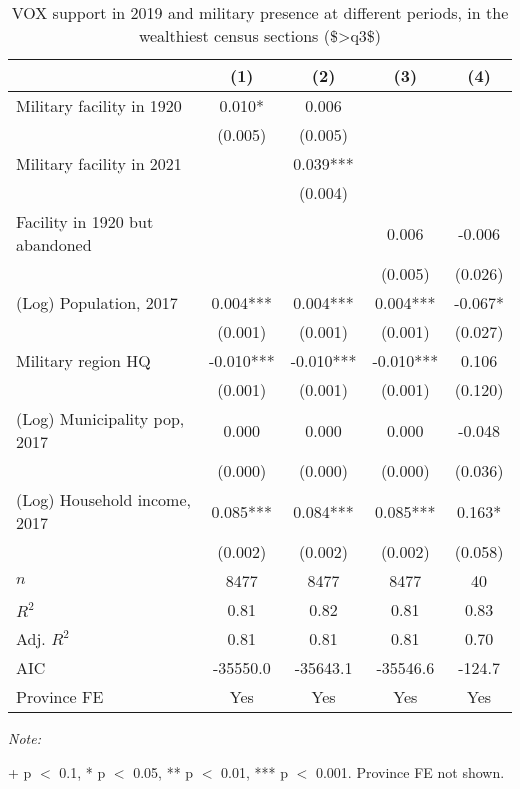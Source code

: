 \begin{table}[!h]

\caption{VOX support in 2019 and military presence at different periods, in the wealthiest census sections (\$>q3\$)\label{tab:lm\_vox\_c1920\_hinc}}
\centering
\begin{threeparttable}
\begin{tabular}[t]{lcccc}
\toprule
  & (1) & (2) & (3) & (4)\\
\midrule
Military facility in 1920 & 0.010* & 0.006 &  & \\
 & (0.005) & (0.005) &  & \\
Military facility in 2021 &  & 0.039*** &  & \\
 &  & (0.004) &  & \\
Facility in 1920 but abandoned &  &  & 0.006 & -0.006\\
 &  &  & (0.005) & (0.026)\\
(Log) Population, 2017 & 0.004*** & 0.004*** & 0.004*** & -0.067*\\
 & (0.001) & (0.001) & (0.001) & (0.027)\\
Military region HQ & -0.010*** & -0.010*** & -0.010*** & 0.106\\
 & (0.001) & (0.001) & (0.001) & (0.120)\\
(Log) Municipality pop, 2017 & 0.000 & 0.000 & 0.000 & -0.048\\
 & (0.000) & (0.000) & (0.000) & (0.036)\\
(Log) Household income, 2017 & 0.085*** & 0.084*** & 0.085*** & 0.163*\\
 & (0.002) & (0.002) & (0.002) & (0.058)\\
\midrule
$n$ & 8477 & 8477 & 8477 & 40\\
$R^2$ & 0.81 & 0.82 & 0.81 & 0.83\\
Adj. $R^2$ & 0.81 & 0.81 & 0.81 & 0.70\\
AIC & -35550.0 & -35643.1 & -35546.6 & -124.7\\
Province FE & Yes & Yes & Yes & Yes\\
\bottomrule
\end{tabular}
\begin{tablenotes}[para]
\item \textit{Note: } 
\item + p $<$ 0.1, * p $<$ 0.05, ** p $<$ 0.01, *** p $<$ 0.001. Province FE not shown.
\end{tablenotes}
\end{threeparttable}
\end{table}
